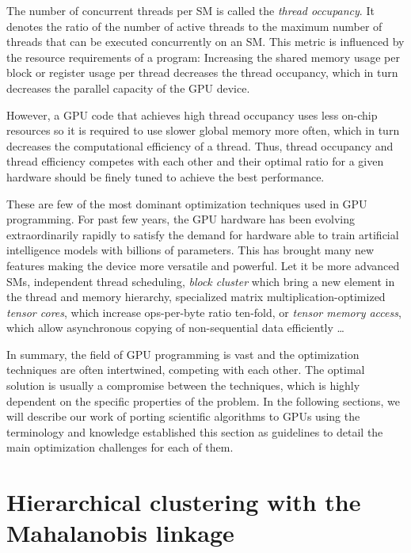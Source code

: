 The number of concurrent threads per SM is called the \emph{thread occupancy}. It denotes the ratio of the number of active threads to the maximum number of threads that can be executed concurrently on an SM. This metric is influenced by the resource requirements of a program: Increasing the shared memory usage per block or register usage per thread decreases the thread occupancy, which in turn decreases the parallel capacity of the GPU device.

However, a GPU code that achieves high thread occupancy uses less on-chip resources so it is required to use slower global memory more often, which in turn decreases the computational efficiency of a thread. Thus, thread occupancy and thread efficiency competes with each other and their optimal ratio for a given hardware should be finely tuned to achieve the best performance.

\vspace{1cm}

These are few of the most dominant optimization techniques used in GPU programming. For past few years, the GPU hardware has been evolving extraordinarily rapidly to satisfy the demand for hardware able to train artificial intelligence models with billions of parameters. This has brought many new features making the device more versatile and powerful. Let it be more advanced SMs, independent thread scheduling, \emph{block cluster} which bring a new element in the thread and memory hierarchy, specialized matrix multiplication-optimized \emph{tensor cores}, which increase ops-per-byte ratio ten-fold, or \emph{tensor memory access}, which allow asynchronous copying of non-sequential data efficiently \dots

In summary, the field of GPU programming is vast and the optimization techniques are often intertwined, competing with each other. The optimal solution is usually a compromise between the techniques, which is highly dependent on the specific properties of the problem. In the following sections, we will describe our work of porting scientific algorithms to GPUs using the terminology and knowledge established this section as guidelines to detail the main optimization challenges for each of them.


\section{Hierarchical clustering with the Mahalanobis linkage}
\label{sec:maha}

